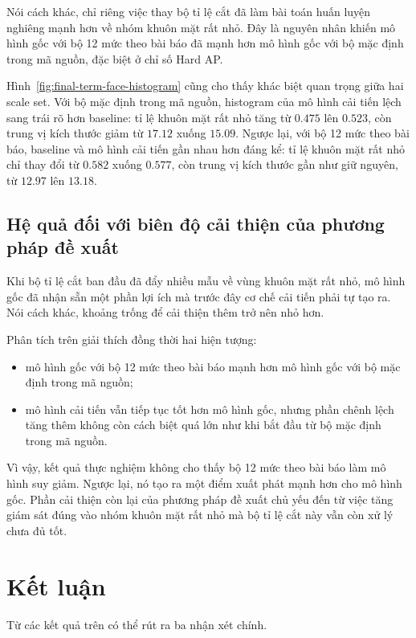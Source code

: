 Nói cách khác, chỉ riêng việc thay bộ tỉ lệ cắt đã làm bài toán huấn luyện nghiêng mạnh hơn về nhóm khuôn mặt rất nhỏ.
Đây là nguyên nhân khiến mô hình gốc với bộ 12 mức theo bài báo đã mạnh hơn mô hình gốc với bộ mặc định trong mã nguồn, đặc biệt ở chỉ số Hard AP.

Hình~\ref{fig:final-term-face-histogram} cũng cho thấy khác biệt quan trọng giữa hai scale set. Với bộ mặc định trong mã nguồn, histogram của mô hình cải tiến lệch sang trái rõ hơn baseline: tỉ lệ khuôn mặt rất nhỏ tăng từ \(0.475\) lên \(0.523\), còn trung vị kích thước giảm từ \(17.12\) xuống \(15.09\). Ngược lại, với bộ 12 mức theo bài báo, baseline và mô hình cải tiến gần nhau hơn đáng kể: tỉ lệ khuôn mặt rất nhỏ chỉ thay đổi từ \(0.582\) xuống \(0.577\), còn trung vị kích thước gần như giữ nguyên, từ \(12.97\) lên \(13.18\).

\subsection{Hệ quả đối với biên độ cải thiện của phương pháp đề xuất}

Khi bộ tỉ lệ cắt ban đầu đã đẩy nhiều mẫu về vùng khuôn mặt rất nhỏ, mô hình gốc đã nhận sẵn một phần lợi ích mà trước đây cơ chế cải tiến phải tự tạo ra.
Nói cách khác, khoảng trống để cải thiện thêm trở nên nhỏ hơn.

Phân tích trên giải thích đồng thời hai hiện tượng:
\begin{itemize}
  \item mô hình gốc với bộ 12 mức theo bài báo mạnh hơn mô hình gốc với bộ mặc định trong mã nguồn;
  \item mô hình cải tiến vẫn tiếp tục tốt hơn mô hình gốc, nhưng phần chênh lệch tăng thêm không còn cách biệt quá lớn như khi bắt đầu từ bộ mặc định trong mã nguồn.
\end{itemize}

Vì vậy, kết quả thực nghiệm không cho thấy bộ 12 mức theo bài báo làm mô hình suy giảm.
Ngược lại, nó tạo ra một điểm xuất phát mạnh hơn cho mô hình gốc.
Phần cải thiện còn lại của phương pháp đề xuất chủ yếu đến từ việc tăng giám sát đúng vào nhóm khuôn mặt rất nhỏ mà bộ tỉ lệ cắt này vẫn còn xử lý chưa đủ tốt.

\section{Kết luận}

Từ các kết quả trên có thể rút ra ba nhận xét chính.

